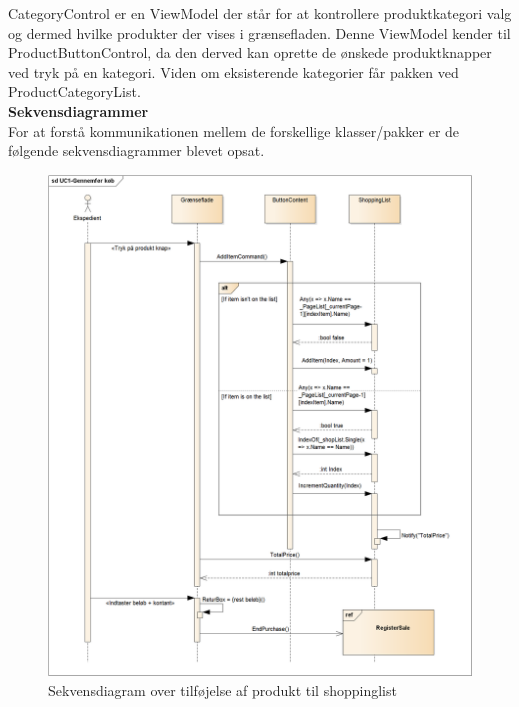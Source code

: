 CategoryControl er en ViewModel der står for at kontrollere produktkategori valg og dermed hvilke produkter der vises i grænsefladen. Denne ViewModel kender til ProductButtonControl, da den derved kan oprette de ønskede produktknapper ved tryk på en kategori. Viden om eksisterende kategorier får pakken ved ProductCategoryList. \\

\textbf{Sekvensdiagrammer} \\
For at forstå kommunikationen mellem de forskellige klasser/pakker er de følgende sekvensdiagrammer blevet opsat. \\

\begin{figure}[H]
	\centering
	\includegraphics[width=1\textwidth]{Systemdesign/Frontend/GUI/Pics/Sekvensdiagram-TilfoejProdukt2}
	\caption{Sekvensdiagram over tilføjelse af produkt til shoppinglist}
	\label{fig:SekvensUC1}
\end{figure}

